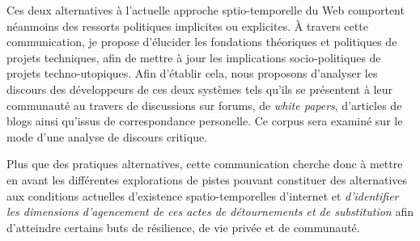 \documentclass{article}
\begin{document}
Ces deux alternatives à l'actuelle approche sptio-temporelle du Web comportent néanmoins des ressorts politiques implicites ou explicites. À travers cette communication, je propose d'élucider les fondations théoriques et politiques de projets techniques, afin de mettre à jour les implications socio-politiques de projets techno-utopiques. Afin d'établir cela, nous proposons d'analyser les discours des développeurs de ces deux systèmes tels qu'ils se présentent à leur communauté au travers de discussions sur forums, de \emph{white papers}, d'articles de blogs ainsi qu'issus de correspondance personelle. Ce corpus sera examiné sur le mode d'une analyse de discours critique.

Plus que des pratiques alternatives, cette communication cherche donc à mettre en avant les différentes explorations de pistes pouvant constituer des alternatives aux conditions actuelles d'existence spatio-temporelles d'internet et \emph{d'identifier les dimensions d'agencement de ces actes de détournements et de substitution} afin d'atteindre certains buts de résilience, de vie privée et de communauté.

\pagebreak



\end{document}
